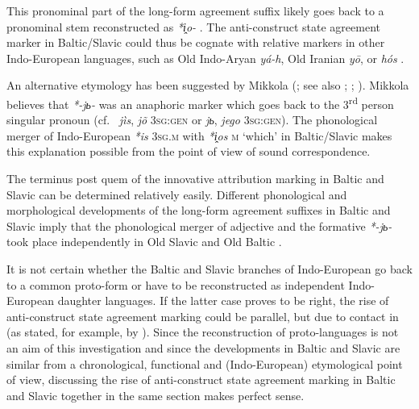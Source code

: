 This pronominal part of the long-form agreement suffix likely goes back to a pronominal stem reconstructed as  \textit{*i̭o-} \citep[61]{wissemann1958}. The anti\hyp{}construct state agreement marker in Baltic\slash{}Slavic could thus be cognate with relative markers in other Indo-European languages, such as Old Indo-Aryan \textit{yá-h}, Old Iranian \textit{yō}, or  \textit{hós} \cite[53]{heinrichs1954}.

An alternative etymology has been suggested by Mikkola (\citeyear[52]{mikkola1950}; %
 see also \citealt[102]{leskien1871}; \citealt[164–165]{leskien1919}; \citealt[19ff.]{wijk1935}). Mikkola believes that  \textit{*-jь-} was an anaphoric marker which goes back to the 3\textsuperscript{rd} person singular pronoun (cf.~ \textit{jìs}, \textit{jõ} \textsc{3sg:gen} or  \textit{jь}, \textit{jego} \textsc{3sg:gen}). The phonological merger of Indo-European \textit{*is} \textsc{3sg.m} with \textit{\textit{*i̭os}} \textsc{m} ‘which’ in Baltic\slash{}Slavic \cite[21 Footnote 8]{schmidt1959} makes this explanation possible from the point of view of sound correspondence.

The terminus post quem of the innovative attribution marking in Baltic and Slavic can be determined relatively easily. Different phonological and morphological developments of the long-form agreement suffixes in Baltic and Slavic imply that the phonological merger of adjective and the formative \textit{*-jь-} took place independently in Old Slavic and Old Baltic \citep[64–65]{koch1992}. 

It is not certain whether the Baltic and Slavic branches of Indo-European go back to a common proto-form or  have to be reconstructed as independent Indo-European daughter languages. If the latter case proves to be right, the rise of anti\hyp{}construct state agreement marking could be parallel, but due to contact in  (as stated, for example, by \citealt[77]{pohl1980}). Since the reconstruction of proto-languages is not an aim of this investigation and since the developments in Baltic and Slavic are similar from a chronological, functional and (Indo-European) etymological point of view, discussing the rise of anti\hyp{}construct state agreement marking in Baltic and Slavic together in the same section makes perfect sense.

